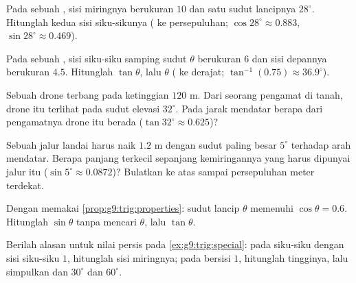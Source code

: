 \begin{exercise}[$\star$]\label{exo:g9:trig:4}
Pada sebuah , sisi miringnya berukuran $10$ dan satu
sudut lancipnya $28^\circ$. Hitunglah kedua sisi siku-sikunya
( ke persepuluhan;
$\cos 28^\circ \approx 0.883$, $\sin 28^\circ \approx 0.469$).
\end{exercise}

\begin{exercise}[$\star$]\label{exo:g9:trig:5}
Pada sebuah , sisi siku-siku samping sudut $\theta$
berukuran $6$ dan sisi depannya berukuran $4.5$. Hitunglah
$\tan\theta$, lalu $\theta$
( ke derajat; $\tan^{-1}(0.75) \approx 36.9^\circ$).
\end{exercise}

\begin{exercise}[$\star\star$]\label{exo:g9:trig:6}
Sebuah drone terbang pada ketinggian $120$ m. Dari seorang pengamat di
tanah, drone itu terlihat pada sudut elevasi $32^\circ$. Pada jarak
mendatar berapa dari pengamatnya drone itu berada
($\tan 32^\circ \approx 0.625$)?
\end{exercise}

\begin{exercise}[$\star\star$]\label{exo:g9:trig:7}
Sebuah jalur landai harus naik $1.2$ m dengan sudut paling besar
$5^\circ$ terhadap arah mendatar. Berapa panjang terkecil sepanjang
kemiringannya yang harus dipunyai jalur itu
($\sin 5^\circ \approx 0.0872$)? Bulatkan ke atas sampai persepuluhan
meter terdekat.
\end{exercise}

\begin{exercise}[$\star\star$]\label{exo:g9:trig:8}
Dengan memakai \cref{prop:g9:trig:properties}: sudut lancip $\theta$
memenuhi $\cos\theta = 0.6$. Hitunglah $\sin\theta$ tanpa mencari
$\theta$, lalu $\tan\theta$.
\end{exercise}

\begin{exercise}[$\star\star\star$]\label{exo:g9:trig:9}
Berilah alasan untuk nilai persis pada \cref{ex:g9:trig:special}: pada
 siku-siku dengan sisi siku-siku $1$, hitunglah sisi
miringnya; pada  bersisi $1$, hitunglah tingginya,
lalu simpulkan  dan  $30^\circ$ dan $60^\circ$.
\end{exercise}

